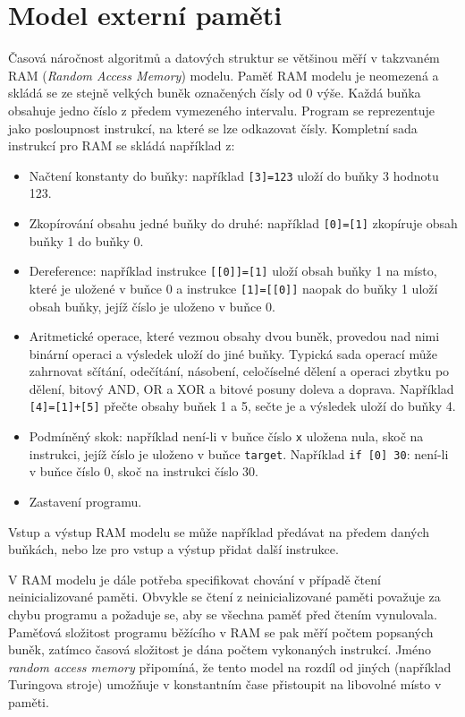 \chapter{Model externí paměti}

Časová náročnost algoritmů a datových struktur se většinou měří v takzvaném
RAM (\textit{Random Access Memory}) modelu. Paměť RAM modelu je neomezená a
skládá se ze stejně velkých buněk označených čísly od 0 výše. Každá buňka
obsahuje jedno číslo z předem vymezeného intervalu. Program se reprezentuje
jako posloupnost instrukcí, na které se lze odkazovat čísly. Kompletní sada
instrukcí pro RAM se skládá například z:
\begin{itemize}
\item
	Načtení konstanty do buňky: například \texttt{[3]=123} uloží do buňky
	3 hodnotu 123.
\item
	Zkopírování obsahu jedné buňky do druhé: například \texttt{[0]=[1]}
	zkopíruje obsah buňky 1 do buňky 0.
\item
	Dereference: například instrukce \texttt{[[0]]=[1]} uloží obsah
	buňky 1 na místo, které je uložené v buňce 0 a instrukce
	\texttt{[1]=[[0]]} naopak do buňky 1 uloží obsah buňky, jejíž
	číslo je uloženo v buňce 0.
\item
	Aritmetické operace, které vezmou obsahy dvou buněk,
	provedou nad nimi binární operaci a výsledek uloží do jiné buňky.
	Typická sada operací může zahrnovat sčítání, odečítání, násobení,
	celočíselné dělení a operaci zbytku po dělení, bitový AND, OR a XOR a
	bitové posuny doleva a doprava.
	Například \texttt{[4]=[1]+[5]} přečte obsahy buňek 1 a 5, sečte je a
	výsledek uloží do buňky 4.
\item
	Podmíněný skok: například není-li v buňce číslo \texttt{x}
	uložena nula, skoč na instrukci, jejíž číslo je uloženo v buňce
	\texttt{target}. Například \texttt{if [0] 30}: není-li v buňce číslo
	0, skoč na instrukci číslo 30.
\item
	Zastavení programu.
\end{itemize}

Vstup a výstup RAM modelu se může například předávat na předem daných buňkách,
nebo lze pro vstup a výstup přidat další instrukce.

V RAM modelu je dále potřeba specifikovat chování v případě čtení
neinicializované paměti. Obvykle se čtení z neinicializované paměti považuje
za chybu programu a požaduje se, aby se všechna paměť před čtením
vynulovala.
Paměťová složitost programu běžícího v RAM se pak měří počtem popsaných buněk,
zatímco časová složitost je dána počtem vykonaných instrukcí.
Jméno \textit{random access memory} připomíná, že tento model na rozdíl od
jiných (například Turingova stroje) umožňuje v konstantním čase přistoupit
na libovolné místo v paměti.

